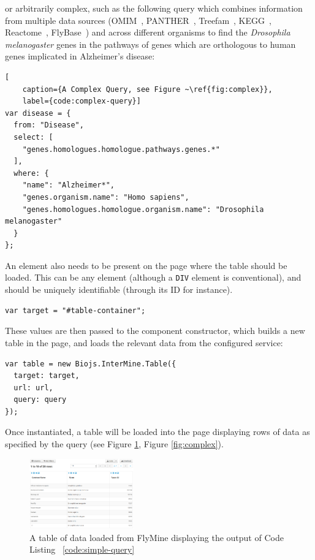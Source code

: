 \documentclass[10pt,a4paper,twocolumn]{article}
\begin{document}
or arbitrarily complex, such as the following query which combines information
from multiple data sources (OMIM~\cite{omim}, PANTHER~\cite{panther},
Treefam~\cite{treefam}, KEGG~\cite{kegg}, Reactome~\cite{reactome},
FlyBase~\cite{flybase}) and across different organisms to find the
\textit{Drosophila melanogaster} genes in the pathways of genes which are
orthologous to human genes implicated in Alzheimer's disease:

\begin{lstlisting}[
    caption={A Complex Query, see Figure ~\ref{fig:complex}},
    label={code:complex-query}]
var disease = {
  from: "Disease",
  select: [
    "genes.homologues.homologue.pathways.genes.*"
  ],
  where: {
    "name": "Alzheimer*",
    "genes.organism.name": "Homo sapiens",
    "genes.homologues.homologue.organism.name": "Drosophila melanogaster"
  }
};
\end{lstlisting}

An element also needs to be present on the page where the table should be
loaded. This can be any element (although a \texttt{DIV} element is
conventional), and should be uniquely identifiable (through its ID for
instance).

\begin{lstlisting}[caption={Defining the Target Element}, label={code:target-el}]
var target = "#table-container";
\end{lstlisting}

These values are then passed to the component constructor, which builds
a new table in the page, and loads the relevant data from the configured service:

\begin{lstlisting}[caption={Instantiation}, label={code:instantiation}]
var table = new Biojs.InterMine.Table({
  target: target,
  url: url,
  query: query
});
\end{lstlisting}

Once instantiated, a table will be loaded into the page displaying rows of data
as specified by the query (see Figure \ref{fig:1}, Figure \ref{fig:complex}).

\begin{figure}
\centering
\includegraphics[width=0.4\textwidth]{imtable.png}
\caption{
    \label{fig:1}
    A table of data loaded from FlyMine displaying the output
   of Code Listing ~\ref{code:simple-query}
}
\end{figure}
\end{document}
